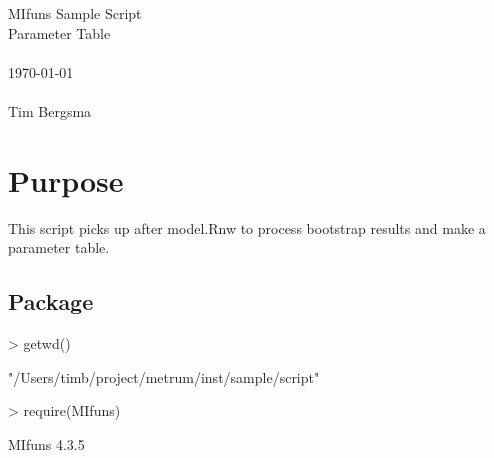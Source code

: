 
\usepackage{Sweave}

 

\vspace*{2cm}
\begin{center}
{\Large MIfuns Sample Script}\\
\vspace{1.5cm}
{\Large Parameter Table}\\
~\\
\today\\
~\\
Tim Bergsma\\
\end{center}
\newpage

\section{Purpose}
This script picks up after model.Rnw to process bootstrap results and make a parameter table.
\subsection{Package}
\begin{Schunk}
\begin{Sinput}
> getwd()
\end{Sinput}
\begin{Soutput}
[1] "/Users/timb/project/metrum/inst/sample/script"
\end{Soutput}
\begin{Sinput}
> require(MIfuns)
\end{Sinput}
\begin{Soutput}
MIfuns 4.3.5 
\end{Soutput}
\end{Schunk}
